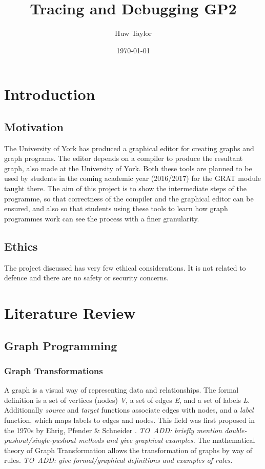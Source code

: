 \documentclass{UoYCSproject}
\author{Huw Taylor}
\title{Tracing and Debugging GP2}
\date{\today}
\begin{document}
\maketitle
\tableofcontents
\listoffigures

\chapter{Introduction}
\section{Motivation}
The University of York has produced a graphical editor for creating graphs and graph programs. The editor depends on a compiler to produce the resultant graph, also made at the University of York. Both these tools are planned to be used by students in the coming academic year (2016/2017) for the GRAT module taught there.
The aim of this project is to show the intermediate steps of the programme, so that correctness of the compiler and the graphical editor can be ensured, and also so that students using these tools to learn how graph programmes work can see the process with a finer granularity.
\section{Ethics}
The project discussed has very few ethical considerations. It is not related to defence and there are no safety or security concerns.

\chapter{Literature Review}
\section{Graph Programming}
\subsection{Graph Transformations}
A graph is a visual way of representing data and relationships. The formal definition is a set of vertices (nodes) \emph{V}, a set of edges \emph{E}, and a set of labels \emph{L}. Additionally \emph{source} and \emph{target} functions associate edges with nodes, and a \emph{label} function, which maps labels to edges and nodes.
This field was first proposed in the 1970s by Ehrig, Pfender \& Schneider \cite{grat_origin}.
\emph{TO~ADD: briefly mention double-pushout/single-pushout methods and give graphical examples.} %
The mathematical theory of Graph Transformation allows the transformation of graphs by way of rules. 
\emph{TO~ADD: give formal/graphical definitions and examples of rules.}
\end{document}
